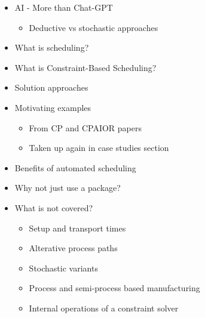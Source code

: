 \documentclass[a4paper]{article}
\begin{document}
\begin{itemize}
\item AI - More than Chat-GPT
\begin{itemize}
\item Deductive vs stochastic approaches
\end{itemize}
\item What is scheduling?
\item What is Constraint-Based Scheduling?
\item Solution approaches
\item Motivating examples
\begin{itemize}
\item From CP and CPAIOR papers
\item Taken up again in case studies section
\end{itemize}
\item Benefits of automated scheduling
\item Why not just use a package?
\item What is not covered?
\begin{itemize}
\item Setup and transport times
\item Alterative process paths
\item Stochastic variants
\item Process and semi-process based manufacturing
\item Internal operations of a constraint solver
\end{itemize}
\end{itemize}
\end{document}
